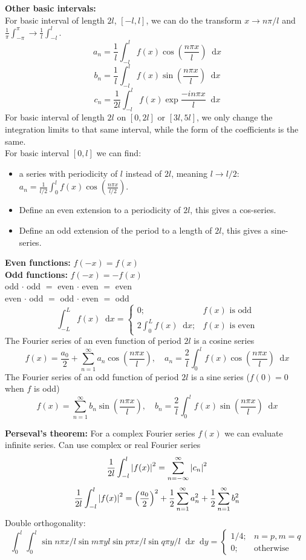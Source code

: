 \documentclass[a4paper, 10pt]{article}
\newcommand*\diff{\mathop{}\!\mathrm{d}}
\begin{document}
\begin{multicols*}{3}
\textbf{Other basic intervals:}\\
For basic interval of length $2l$, $[-l, l]$, we can do the transform $x\rightarrow n\pi/l$ and $\frac{1}{\pi}\int_{-\pi}^\pi \rightarrow \frac{1}{l}\int_{-l}^l$.
$$ a_n = \frac{1}{l}\int_{-l}^l f(x) \cos{\left(\frac{n\pi x}{l}\right)} \diff x$$
$$ b_n = \frac{1}{l}\int_{-l}^l f(x) \sin{\left(\frac{n\pi x}{l}\right)} \diff x$$
$$ c_n = \frac{1}{2l}\int_{-l}^l f(x) \exp{\frac{-in\pi x}{l}} \diff x$$
For basic interval of length $2l$ on $[0, 2l]$ or $[3l, 5l]$, we only change the integration limits to that same interval, while the form of the coefficients is the same.\\
For basic interval $[0, l]$ we can find:
\begin{itemize}
  \item a series with periodicity of $l$ instead of $2l$, meaning $l\rightarrow l/2$: $a_n = \frac{1}{l/2}\int_0^l f(x)\cos{\left( \frac{n\pi x}{l/2} \right)}$.
  \item Define an even extension to a periodicity of $2l$, this gives a cos-series.
  \item Define an odd extension of the period to a length of $2l$, this gives a sine-series.
\end{itemize}
\textbf{Even functions:} $f(-x)=f(x)$\\
\textbf{Odd  functions:} $f(-x)=-f(x)$\\
odd $\cdot$ odd $=$ even $\cdot$ even $=$ even\\
even $\cdot$ odd $=$ odd $\cdot$ even $=$ odd
\begin{equation*} \int_{-L}^{L}f(x) \diff x = \begin{cases}
0; & f(x) \text{ is odd} \\
2\int_0^L f(x) \diff x; & f(x) \text{ is even}
\end{cases} \end{equation*}
The Fourier series of an even function of period $2l$ is a cosine series
$$f(x)= \frac{a_0}{2} + \sum_{n=1}^{\infty} a_n \cos{\left( \frac{n\pi x}{l} \right)},\quad a_n = \frac{2}{l}\int_0^lf(x)\cos{\left( \frac{n\pi x}{l} \right)}\diff x $$
The Fourier series of an odd function of period $2l$ is a sine series ($f(0)=0$ when $f$ is odd)
$$f(x)= \sum_{n=1}^{\infty} b_n \sin{\left( \frac{n\pi x}{l} \right)},\quad b_n = \frac{2}{l}\int_0^lf(x)\sin{\left( \frac{n\pi x}{l} \right)}\diff x $$

\textbf{Perseval's theorem:}
For a complex Fourier series $f(x)$ we can evaluate infinite series. Can use complex or real Fourier series
$$ \frac{1}{2l}\int_{-l}^{l} \abs{f(x)}^2 = \sum_{n=-\infty}^{\infty} \abs{c_n}^2$$
$$ \frac{1}{2l}\int_{-l}^{l} \abs{f(x)}^2 = \left(\frac{a_0}{2}\right)^2 + \frac{1}{2}\sum_{n=1}^{\infty} a_n^2 + \frac{1}{2}\sum_{n=1}^{\infty} b_n^2$$
Double orthogonality:
$$\int_0^l\int_0^l \sin{n\pi x/l}\sin{m\pi y l}\sin{p\pi x/l}\sin{q\pi y/l} \diff x \diff y = \begin{cases}
1/4; & n=p, m=q \\
0;   & \text{otherwise} \end{cases}$$
\begin{mdframed}

\end{mdframed}
\end{multicols*}
\end{document}
